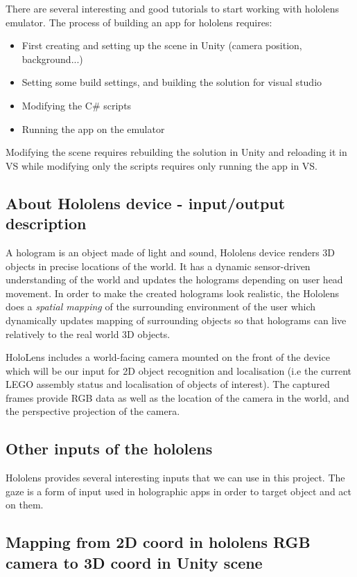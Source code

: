 \documentclass[a4paper,10pt]{article}
\begin{document}
There are several interesting and good tutorials to start working with hololens emulator. The process of building an app for hololens requires:
\begin{itemize}
	\item First creating and setting up the scene in Unity (camera position, background...)
	\item Setting some build settings, and building the solution for visual studio
	\item Modifying the C\# scripts 
	\item Running the app on the emulator
\end{itemize}

Modifying the scene requires rebuilding the solution in Unity and reloading it in VS while modifying only the scripts requires only running the app in VS.

\subsection{About Hololens device - input/output description}

A hologram is an object made of light and sound, Hololens device renders 3D objects in precise locations of the world. It has a dynamic sensor-driven understanding of the world and updates the holograms depending on user head movement. In order to make the created holograms look realistic, the Hololens does a \emph{spatial mapping} of the surrounding environment of the user which dynamically updates mapping of surrounding objects so that holograms can live relatively to the real world 3D objects. 

HoloLens includes a world-facing camera mounted on the front of the device which will be our input for 2D object recognition and localisation (i.e the current LEGO assembly status and localisation of objects of interest). The captured frames provide RGB data as well as the location of the camera in the world, and the perspective projection of the camera. 

\subsection{Other inputs of the hololens}

Hololens provides several interesting inputs that we can use in this project. The gaze is a form of input used in holographic apps in order to target object and act on them. 


\subsection{Mapping from 2D coord in hololens RGB camera to 3D coord in Unity scene}
\end{document}
